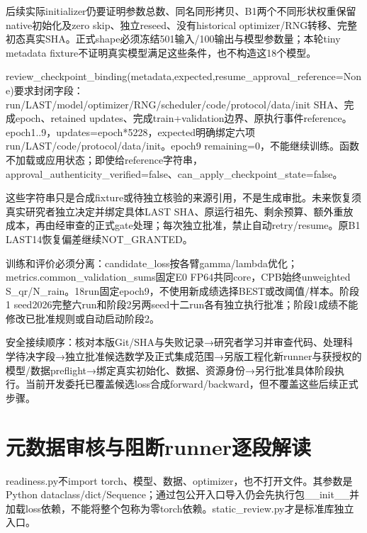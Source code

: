 \documentclass[UTF8,fontset=fandol,10pt]{ctexart}
\begin{document}
后续实际initializer仍要证明参数总数、同名同形拷贝、B1两个不同形状权重保留native初始化及zero skip、独立reseed、没有historical optimizer/\allowbreak{}RNG转移、完整初态真实SHA。正式shape必须冻结501输入/\allowbreak{}100输出与模型参数量；本轮tiny metadata fixture不证明真实模型满足这些条件，也不构造这18个模型。

review\_\allowbreak{}checkpoint\_\allowbreak{}binding(metadata,expected,resume\_\allowbreak{}approval\_\allowbreak{}reference=None)要求封闭字段：run/\allowbreak{}LAST/\allowbreak{}model/\allowbreak{}optimizer/\allowbreak{}RNG/\allowbreak{}scheduler/\allowbreak{}code/\allowbreak{}protocol/\allowbreak{}data/\allowbreak{}init SHA、完成epoch、retained updates、完成train+validation边界、原执行事件reference。epoch1..9，updates=epoch*5228，expected明确绑定六项run/\allowbreak{}LAST/\allowbreak{}code/\allowbreak{}protocol/\allowbreak{}data/\allowbreak{}init。epoch9 remaining=0，不能继续训练。函数不加载或应用状态；即使给reference字符串，approval\_\allowbreak{}authenticity\_\allowbreak{}verified=false、can\_\allowbreak{}apply\_\allowbreak{}checkpoint\_\allowbreak{}state=false。

这些字符串只是合成fixture或待独立核验的来源引用，不是生成审批。未来恢复须真实研究者独立决定并绑定具体LAST SHA、原运行祖先、剩余预算、额外重放成本，再由经审查的正式gate处理；每次独立批准，禁止自动retry/\allowbreak{}resume。原B1 LAST14恢复偏差继续NOT\_\allowbreak{}GRANTED。

训练和评价必须分离：candidate\_\allowbreak{}loss按各臂gamma/\allowbreak{}lambda优化；metrics.common\_\allowbreak{}validation\_\allowbreak{}sums固定E0 FP64共同core，CPB始终unweighted S\_\allowbreak{}qr/\allowbreak{}N\_\allowbreak{}rain。18run固定epoch9，不使用新成绩选择BEST或改阈值/\allowbreak{}样本。阶段1 seed2026完整六run和阶段2另两seed十二run各有独立执行批准；阶段1成绩不能修改已批准规则或自动启动阶段2。

安全接续顺序：核对本版Git/\allowbreak{}SHA与失败记录→研究者学习并审查代码、处理科学待决字段→独立批准候选数学及正式集成范围→另版工程化新runner与获授权的模型/\allowbreak{}数据preflight→绑定真实初始化、数据、资源身份→另行批准具体阶段执行。当前开发委托已覆盖候选loss合成forward/\allowbreak{}backward，但不覆盖这些后续正式步骤。
\clearpage\section{元数据审核与阻断runner逐段解读}

readiness.py不import torch、模型、数据、optimizer，也不打开文件。其参数是Python dataclass/\allowbreak{}dict/\allowbreak{}Sequence；通过包公开入口导入仍会先执行包\_\allowbreak{}\_\allowbreak{}init\_\allowbreak{}\_\allowbreak{}并加载loss依赖，不能将整个包称为零torch依赖。static\_\allowbreak{}review.py才是标准库独立入口。
\end{document}
